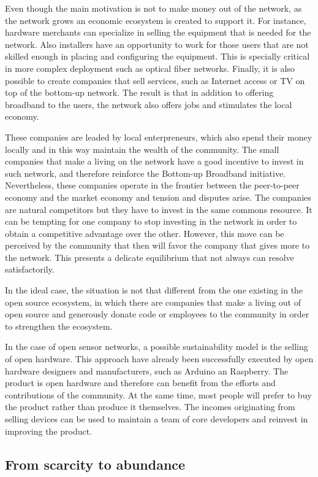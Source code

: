 \documentclass[journal]{IEEEtran}
\begin{document}
Even though the main motivation is not to make money out of the network, as the network grows an economic ecosystem is created to support it.
For instance, hardware merchants can specialize in selling the equipment that is needed for the network.
Also installers have an opportunity to work for those users that are not skilled enough in placing and configuring the equipment.
This is specially critical in more complex deployment such as optical fiber networks.
Finally, it is also possible to create companies that sell services, such as Internet access or TV on top of the bottom-up network.
The result is that in addition to offering broadband to the users, the network also offers jobs and stimulates the local economy.

These companies are leaded by local enterpreneurs, which also spend their money locally and in this way maintain the wealth of the community.
The small companies that make a living on the network have a good incentive to invest in such network, and therefore reinforce the Bottom-up Broadband initiative.
Nevertheless, these companies operate in the frontier between the peer-to-peer economy and the market economy and tension and disputes arise.
The companies are natural competitors but they have to invest in the same commons resource.
It can be tempting for one company to stop investing in the network in order to obtain a competitive advantage over the other.
However, this move can be perceived by the community that then will favor the company that gives more to the network.
This presents a delicate equilibrium that not always can resolve satisfactorily.

In the ideal case, the situation is not that different from the one existing in the open source ecosystem, in which there are companies that make a living out of open source and generously donate code or employees to the community in order to strengthen the ecosystem.

In the case of open sensor networks, a possible sustainability model is the selling of open hardware.
This approach have already been successfully executed by open hardware designers and manufacturers, such as Arduino an Raspberry.
The product is open hardware and therefore can benefit from the efforts and contributions of the community.
At the same time, most people will prefer to buy the product rather than produce it themselves.
The incomes originating from selling devices can be used to maintain a team of core developers and reinvest in improving the product.


\subsection{From scarcity to abundance}
\end{document}
